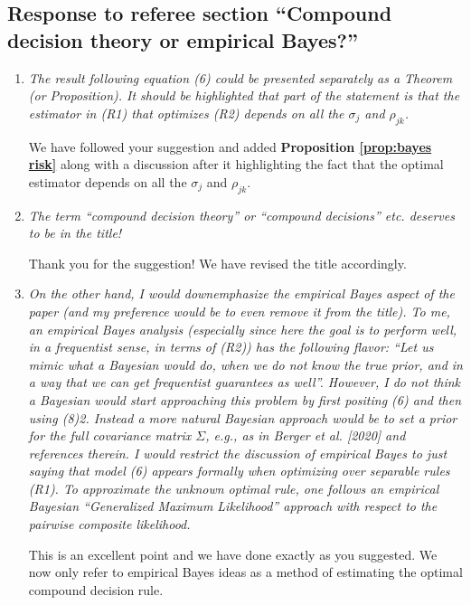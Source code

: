 \documentclass[12pt]{article}
\begin{document}
\subsection{Response to referee section ``Compound decision theory or empirical Bayes?''}
\begin{enumerate}
\item \emph{The result following equation (6) could be presented separately as a Theorem (or Proposition). It should be highlighted that part of the statement is that the estimator in (R1) that optimizes (R2) depends on all the $\sigma_{j}$ and $\rho_{jk}$.}

  We have followed your suggestion and added \textbf{Proposition \ref{prop:bayes risk}} along with a discussion after it highlighting the fact that the optimal estimator depends on all the $\sigma_{j}$ and $\rho_{jk}$.
  
\item \emph{The term ``compound decision theory'' or ``compound decisions'' etc. deserves to be in the title!}

  Thank you for the suggestion! We have revised the title accordingly.
  
\item \emph{On the other hand, I would downemphasize the empirical Bayes aspect of the paper (and my preference would be to even remove it from the title). To me, an empirical Bayes analysis (especially since here the goal is to perform well, in a frequentist sense, in terms of (R2)) has the following flavor: ``Let us mimic what a Bayesian would do, when we do not know the true prior, and in a way that we can get frequentist guarantees as well''. However, I do not think a Bayesian would start approaching this problem by first positing (6) and then using (8)2. Instead a more natural Bayesian approach would be to set a prior for the full covariance matrix $\Sigma$, e.g., as in Berger et al. [2020] and references therein. I would restrict the discussion of empirical Bayes to just saying that model (6) appears formally when optimizing over separable rules (R1). To approximate the unknown optimal rule, one follows an empirical Bayesian ``Generalized Maximum Likelihood'' approach with respect to the pairwise composite likelihood.}

  This is an excellent point and we have done exactly as you suggested. We now only refer to empirical Bayes ideas as a method of estimating the optimal compound decision rule.
  
\end{enumerate}
\end{document}
